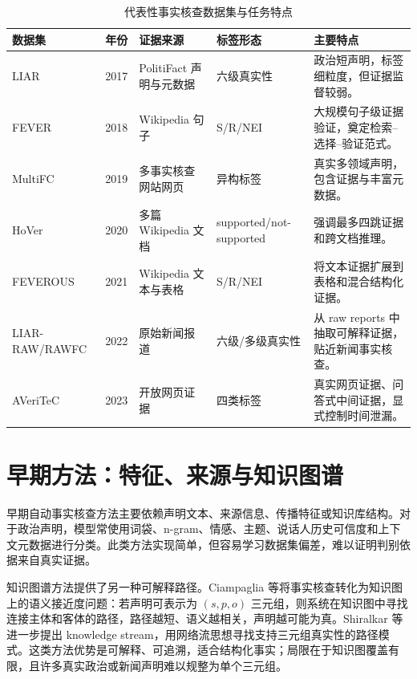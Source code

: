 \documentclass[UTF8,a4paper,zihao=5,twocolumn]{ctexart}
\begin{document}
\begin{table}[t]
\centering
\caption{代表性事实核查数据集与任务特点}
\label{tab:datasets}
\small
\begin{tabularx}{\textwidth}{p{2.4cm}p{1.4cm}p{2.3cm}p{2.5cm}X}
\toprule
数据集 & 年份 & 证据来源 & 标签形态 & 主要特点 \\
\midrule
LIAR & 2017 & PolitiFact 声明与元数据 & 六级真实性 & 政治短声明，标签细粒度，但证据监督较弱\cite{Wang2017LIAR}。\\
FEVER & 2018 & Wikipedia 句子 & S/R/NEI & 大规模句子级证据验证，奠定检索--选择--验证范式\cite{Thorne2018FEVER}。\\
MultiFC & 2019 & 多事实核查网站网页 & 异构标签 & 真实多领域声明，包含证据与丰富元数据\cite{Augenstein2019MultiFC}。\\
HoVer & 2020 & 多篇 Wikipedia 文档 & supported/not-supported & 强调最多四跳证据和跨文档推理\cite{Jiang2020HoVer}。\\
FEVEROUS & 2021 & Wikipedia 文本与表格 & S/R/NEI & 将文本证据扩展到表格和混合结构化证据\cite{Aly2021FEVEROUS}。\\
LIAR-RAW/RAWFC & 2022 & 原始新闻报道 & 六级/多级真实性 & 从 raw reports 中抽取可解释证据，贴近新闻事实核查\cite{Yang2022CofCED}。\\
AVeriTeC & 2023 & 开放网页证据 & 四类标签 & 真实网页证据、问答式中间证据，显式控制时间泄漏\cite{Schlichtkrull2023AVeriTeC}。\\
\bottomrule
\end{tabularx}
\end{table}

\section{早期方法：特征、来源与知识图谱}

早期自动事实核查方法主要依赖声明文本、来源信息、传播特征或知识库结构。对于政治声明，模型常使用词袋、n-gram、情感、主题、说话人历史可信度和上下文元数据进行分类。此类方法实现简单，但容易学习数据集偏差，难以证明判别依据来自真实证据。

知识图谱方法提供了另一种可解释路径。Ciampaglia 等将事实核查转化为知识图上的语义接近度问题：若声明可表示为 $(s,p,o)$ 三元组，则系统在知识图中寻找连接主体和客体的路径，路径越短、语义越相关，声明越可能为真\cite{Ciampaglia2015KGFactChecking}。Shiralkar 等进一步提出 knowledge stream，用网络流思想寻找支持三元组真实性的路径模式\cite{Shiralkar2017KnowledgeStreams}。这类方法优势是可解释、可追溯，适合结构化事实；局限在于知识图覆盖有限，且许多真实政治或新闻声明难以规整为单个三元组。
\end{document}
